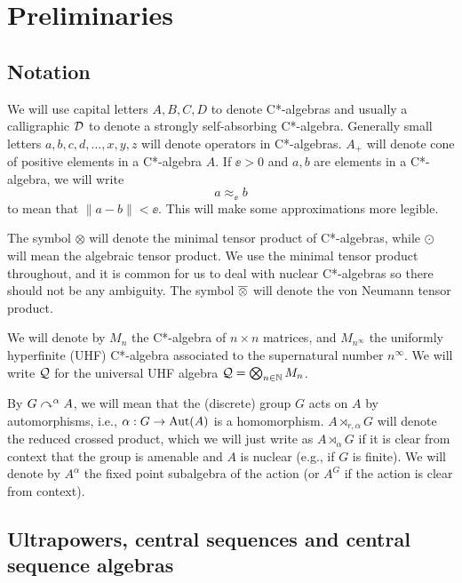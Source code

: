 \documentclass[12pt]{amsart}
\begin{document}

  
    \section{Preliminaries}\label{preliminaries}

  \subsection{Notation} We will use capital letters $A,B,C,D$ to denote C*-algebras and usually a calligraphic $\mathcal{D}$ to denote a strongly self-absorbing C*-algebra. Generally small letters $a,b,c,d,\dots,x,y,z$ will denote operators in C*-algebras. $A_+$ will denote cone of positive elements in a C*-algebra $A$. If $\ee > 0$ and $a,b$ are elements in a C*-algebra, we will write
\begin{equation}
   a \approx_\ee b
\end{equation}
  to mean that $\|a - b\| < \ee$. This will make some approximations more legible. 

  The symbol $\otimes$ will denote the minimal tensor product of C*-algebras, while $\odot$ will mean the algebraic tensor product. We use the minimal tensor product throughout, and it is common for us to deal with nuclear C*-algebras so there should not be any ambiguity. The symbol $\overline{\otimes}$ will denote the von Neumann tensor product. 

  We will denote by $M_n$ the C*-algebra of $n\times n$ matrices, and $M_{n^{\infty}}$ the uniformly hyperfinite (UHF) C*-algebra associated to the supernatural number $n^{\infty}$. We will write $\mathcal{Q}$ for the universal UHF algebra $\mathcal{Q} = \bigotimes_{n \in \mathbb{N}} M_n$. 

  By $G \curvearrowright^\alpha A$, we will mean that the (discrete) group $G$ acts on $A$ by automorphisms, i.e., $\alpha: G \to \operatorname{Aut}(A)$ is a homomorphism. $A \rtimes_{r,\alpha}G$ will denote the reduced crossed product, which we will just write as $A \rtimes_\alpha G$ if it is clear from context that the group is amenable and $A$ is nuclear (e.g., if $G$ is finite). We will denote by $A^\alpha$ the fixed point subalgebra of the action (or $A^G$ if the action is clear from context).


\subsection{Ultrapowers, central sequences and central sequence algebras}\label{section:ultrapowers}
\end{document}

